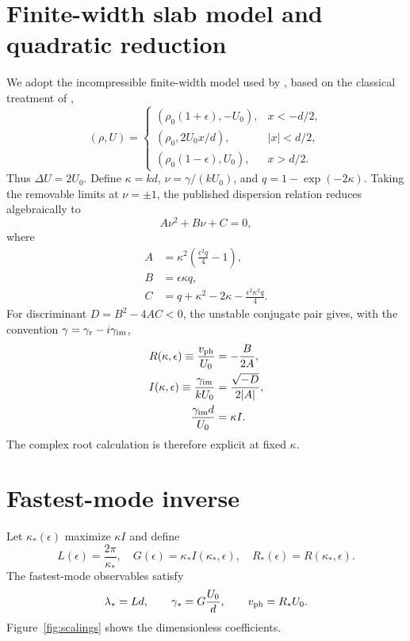 \documentclass[linenumbers]{aastex7}
\begin{document}
\section{Finite-width slab model and quadratic reduction}
We adopt the incompressible finite-width model used by \citet{Kuridze2026}, based on the classical treatment of \citet{Chandrasekhar1961},
\begin{equation}
(\rho,U)=
\left\{
\begin{array}{ll}
(\rho_0(1+\epsilon),-U_0), & x<-d/2,\\
(\rho_0,2U_0x/d), & |x|<d/2,\\
(\rho_0(1-\epsilon),U_0), & x>d/2.
\end{array}
\right.
\end{equation}
Thus $\Delta U=2U_0$. Define $\kappa=kd$, $\nu=\gamma/(kU_0)$, and $q=1-\exp(-2\kappa)$. Taking the removable limits at $\nu=\pm1$, the published dispersion relation reduces algebraically to
\begin{equation}
A\nu^2+B\nu+C=0,
\end{equation}
where
\begin{align}
A&=\kappa^2\left(\frac{\epsilon^2q}{4}-1\right),\\
B&=\epsilon\kappa q,\\
C&=q+\kappa^2-2\kappa-\frac{\epsilon^2\kappa^2q}{4}.
\end{align}
For discriminant $D=B^2-4AC<0$, the unstable conjugate pair gives, with the convention $\gamma=\gamma_{\rm r}-i\gamma_{\rm im}$,
\begin{align}
R(\kappa,\epsilon)\equiv\frac{v_{\rm ph}}{U_0}&=-\frac{B}{2A},\\
I(\kappa,\epsilon)\equiv\frac{\gamma_{\rm im}}{kU_0}
&=\frac{\sqrt{-D}}{2|A|},\\
\frac{\gamma_{\rm im}d}{U_0}&=\kappa I.
\end{align}
The complex root calculation is therefore explicit at fixed $\kappa$.

\section{Fastest-mode inverse}
Let $\kappa_\ast(\epsilon)$ maximize $\kappa I$ and define
\begin{equation}
L(\epsilon)=\frac{2\pi}{\kappa_\ast},\quad
G(\epsilon)=\kappa_\ast I(\kappa_\ast,\epsilon),\quad
R_\ast(\epsilon)=R(\kappa_\ast,\epsilon).
\end{equation}
The fastest-mode observables satisfy
\begin{equation}
\lambda_\ast=Ld,\qquad
\gamma_\ast=G\frac{U_0}{d},\qquad
v_{\rm ph}=R_\ast U_0.
\end{equation}
Figure~\ref{fig:scalings} shows the dimensionless coefficients.
\end{document}
